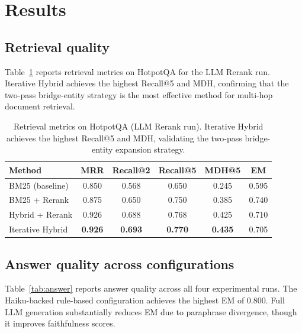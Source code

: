 \documentclass{article}
\begin{document}
\section{Results}
\label{sec:results}

\subsection{Retrieval quality}

Table~\ref{tab:retrieval} reports retrieval metrics on HotpotQA for the
LLM Rerank run.  Iterative Hybrid achieves the highest Recall@5 and
MDH, confirming that the two-pass bridge-entity strategy is the most
effective method for multi-hop document retrieval.

\begin{table}[h]
  \caption{Retrieval metrics on HotpotQA (LLM Rerank run).
  Iterative Hybrid achieves the highest Recall@5 and MDH, validating
  the two-pass bridge-entity expansion strategy.}
  \label{tab:retrieval}
  \centering
  \small
  \begin{tabular}{lccccc}
    \toprule
    Method & MRR & Recall@2 & Recall@5 & MDH@5 & EM \\
    \midrule
    BM25 (baseline)       & 0.850 & 0.568 & 0.650 & 0.245 & 0.595 \\
    BM25 + Rerank         & 0.875 & 0.650 & 0.750 & 0.385 & 0.740 \\
    Hybrid + Rerank       & 0.926 & 0.688 & 0.768 & 0.425 & 0.710 \\
    Iterative Hybrid      & \textbf{0.926} & \textbf{0.693} & \textbf{0.770} & \textbf{0.435} & 0.705 \\
    \bottomrule
  \end{tabular}
\end{table}

\subsection{Answer quality across configurations}

Table~\ref{tab:answer} reports answer quality across all four experimental
runs.  The Haiku-backed rule-based configuration achieves the highest
EM of 0.800.  Full LLM generation substantially reduces EM due to
paraphrase divergence, though it improves faithfulness scores.
\end{document}
